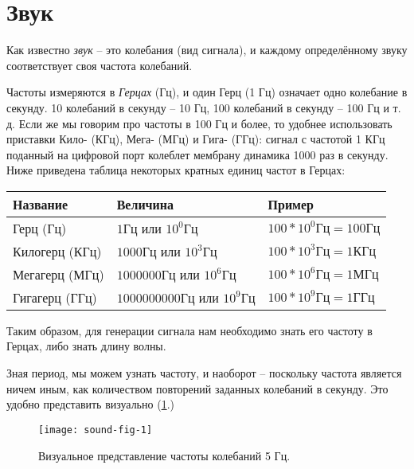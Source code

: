 \documentclass[../sparc.tex]{subfiles}
\begin{document}
\section{Звук}


Как известно \emph{звук} -- это колебания (вид сигнала), и каждому определённому
звуку соответствует своя частота колебаний.

Частоты измеряются в \emph{Герцах} (\gls{Гц}), и один Герц (1 Гц) означает одно
колебание в секунду. 10 колебаний в секунду -- 10 Гц, 100 колебаний в секунду --
100 Гц и т. д. Если же мы говорим про частоты в 100 Гц и более, то удобнее
использовать приставки Кило- (\gls{КГц}), Мега- (\gls{МГц}) и Гига- (\gls{ГГц}):
сигнал с частотой 1 КГц поданный на цифровой порт колеблет мембрану динамика
1000 раз в секунду.  Ниже приведена таблица некоторых кратных единиц частот в
Герцах:

\begin{tabular}{p{3cm}|p{4cm}|p{3.5cm}}
  Название & Величина & Пример \\
  \hline \hline
  Герц (Гц)
  & $ 1 \mbox{Гц} $ или $ 10^0 \mbox{Гц} $
  & $ 100 * 10^0 \mbox{Гц} = 100 \mbox{Гц} $ \\
  \hline
  Килогерц (КГц)
  & $ 1000 \mbox{Гц} $ или $ 10^3 \mbox{Гц} $
  & $ 100 * 10^3 \mbox{Гц} = 1 \mbox{КГц} $ \\
  \hline
  Мегагерц (МГц)
  & $ 1000000 \mbox{Гц} $ или $ 10^6 \mbox{Гц} $
  & $ 100 * 10^6 \mbox{Гц} = 1 \mbox{МГц} $ \\
  \hline
  Гигагерц (ГГц)
  & $ 1000000000 \mbox{Гц} $ или $ 10^9 \mbox{Гц} $
  & $ 100 * 10^9 \mbox{Гц} = 1 \mbox{ГГц} $ \\
\end{tabular}

Таким образом, для генерации сигнала нам необходимо знать его частоту в Герцах,
либо знать длину волны.

Зная период, мы можем узнать частоту, и наоборот -- поскольку частота является
ничем иным, как количеством повторений заданных колебаний в секунду. Это удобно
представить визуально (\ref{fig:sound-fig-1}.)

\begin{figure}[h]
  \caption{Визуальное представление частоты колебаний 5 Гц.}
  \label{fig:sound-fig-1}
  \texttt{[image: sound-fig-1]}
  \centering
\end{figure}
\end{document}
